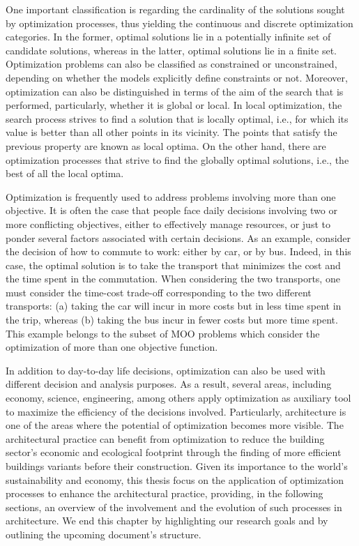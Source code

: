	One important classification is regarding the cardinality of the solutions sought by optimization processes, thus yielding the continuous and discrete optimization categories. In the former, optimal solutions lie in a potentially infinite set of candidate solutions, whereas in the latter, optimal solutions lie in a finite set. Optimization problems can also be classified as constrained or unconstrained, depending on whether the models explicitly define constraints or not. Moreover, optimization can also be distinguished in terms of the aim of the search that is performed, particularly, whether it is global or local. In local optimization, the search process strives to find a solution that is locally optimal, i.e., for which its value is better than all other points in its vicinity. The points that satisfy the previous property are known as local optima. On the other hand, there are optimization processes that strive to find the globally optimal solutions, i.e., the best of all the local optima.

	Optimization is frequently used to address problems involving more than one objective. It is often the case that people face daily decisions involving two or more conflicting objectives, either to effectively manage resources, or just to ponder several factors associated with certain decisions. As an example, consider the decision of how to commute to work: either by car, or by bus. Indeed, in this case, the optimal solution is to take the transport that minimizes the cost and the time spent in the commutation. When considering the two transports, one must consider the time-cost trade-off corresponding to the two different transports: (a) taking the car will incur in more costs but in less time spent in the trip, whereas (b) taking the bus incur in fewer costs but more time spent.   This example belongs to the subset of \ac{MOO} problems which consider the optimization of more than one objective function. 

	In addition to day-to-day life decisions, optimization can also be used with different decision and analysis purposes. As a result, several areas, including economy, science, engineering, among others apply optimization as auxiliary tool to maximize the efficiency of the decisions involved. Particularly, architecture is one of the areas where the potential of optimization becomes more visible. The architectural practice can benefit from optimization to reduce the building sector's economic and ecological footprint through the finding of more efficient buildings variants before their construction. Given its importance to the world's sustainability and economy, this thesis focus on the application of optimization processes to enhance the architectural practice, providing, in the following sections, an overview of the involvement and the evolution of such processes in architecture. We end this chapter by highlighting our research goals and by outlining the upcoming document's structure.


